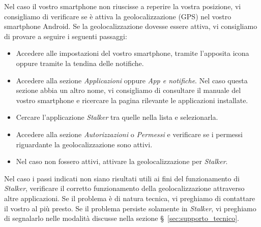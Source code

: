 \documentclass[../manuale-utente.tex]{subfiles}
\begin{document}
Nel caso il vostro smartphone non riuscisse a reperire la vostra posizione, vi consigliamo di verificare se è attiva la geolocalizzazione (GPS) nel vostro smartphone Android.
Se la geolocalizzazione dovesse essere attiva, vi consigliamo di provare a seguire i seguenti passaggi:
\begin{itemize}
    \item Accedere alle impostazioni del vostro smartphone, tramite l'apposita icona oppure tramite la tendina delle notifiche.
    \item Accedere alla sezione \textit{Applicazioni} oppure \textit{App e notifiche}. Nel caso questa sezione abbia un altro nome, vi consigliamo di consultare il manuale del vostro smartphone e ricercare la pagina rilevante le applicazioni installate.
    \item Cercare l'applicazione \textit{Stalker} tra quelle nella lista e selezionarla.
    \item Accedere alla sezione \textit{Autorizzazioni} o \textit{Permessi} e verificare se i permessi riguardante la geolocalizzazione sono attivi.
    \item Nel caso non fossero attivi, attivare la geolocalizzazione per \textit{Stalker}.
\end{itemize}
Nel caso i passi indicati non siano risultati utili ai fini del funzionamento di \textit{Stalker}, verificare il corretto funzionamento della geolocalizzazione attraverso altre applicazioni.
Se il problema è di natura tecnica, vi preghiamo di contattare il vostro \textit{} al più presto.
Se il problema persiste solamente in \textit{Stalker}, vi preghiamo di segnalarlo nelle modalità discusse nella sezione §~\ref{sec:supporto_tecnico}.
\end{document}
